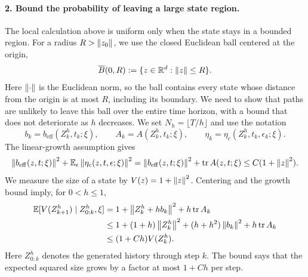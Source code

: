 \paragraph{2. Bound the probability of leaving a large state region.}
The local calculation above is uniform only when the state stays in a bounded region. For a radius $R>\left\lVert z_0\right\rVert$, we use the closed Euclidean ball centered at the origin,
\begin{equation}\label{eq:state-ball}
 \overline B(0,R):=\{z\in\mathbb R^d:\left\lVert z\right\rVert\leq R\}.
\end{equation}
Here $\left\lVert \cdot\right\rVert$ is the Euclidean norm, so the ball contains every state whose distance from the origin is at most $R$, including its boundary. We need to show that paths are unlikely to leave this ball over the entire time horizon, with a bound that does not deteriorate as $h$ decreases. We set $N_h=\lfloor T/h\rfloor$ and use the notation
\[
 b_k=b_{\mathrm{eff}}(Z_k^h,t_k;\xi),\qquad
 A_k=A(Z_k^h,t_k;\xi),\qquad
 \eta_k=\eta_c(Z_k^h,t_k,\epsilon_k;\xi).
\]
The linear-growth assumption gives
\begin{equation}\label{eq:innovation-growth}
 \left\lVert b_{\mathrm{eff}}(z,t;\xi)\right\rVert^2+
 \mathbb E_\epsilon\left\lVert \eta_c(z,t,\epsilon;\xi)\right\rVert^2
 =\left\lVert b_{\mathrm{eff}}(z,t;\xi)\right\rVert^2+\operatorname{tr}A(z,t;\xi)
 \leq C(1+\left\lVert z\right\rVert^2).
\end{equation}
We measure the size of a state by $V(z)=1+\left\lVert z\right\rVert^2$. Centering and the growth bound imply, for $0<h\leq1$,
\begin{align}\label{eq:one-step-size}
 \mathbb E[V(Z_{k+1}^h)\mid Z^h_{0:k},\xi]
 &=1+\left\lVert Z_k^h+h b_k\right\rVert^2+h\operatorname{tr}A_k\notag\\
 &\leq1+(1+h)\left\lVert Z_k^h\right\rVert^2+(h+h^2)\left\lVert b_k\right\rVert^2
          +h\operatorname{tr}A_k\notag\\
 &\leq(1+Ch)V(Z_k^h).
\end{align}
Here $Z^h_{0:k}$ denotes the generated history through step $k$. The bound says that the expected squared size grows by a factor at most $1+Ch$ per step.

